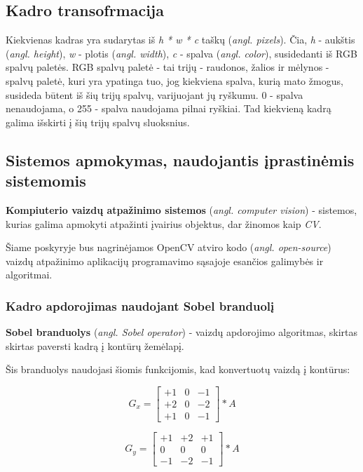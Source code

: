 \documentclass{VUMIFInfKursinis}
\begin{document}
\subsection{Kadro transofrmacija}
Kiekvienas kadras yra sudarytas iš \textit{h * w * c} taškų (\textit{angl. pixels}). Čia, \textit{h} - aukštis (\textit{angl. height}), \textit{w} - plotis (\textit{angl. width}), \textit{c} - spalva (\textit{angl. color}), susidedanti iš RGB spalvų paletės. RGB spalvų paletė - tai trijų - raudonos, žalios ir mėlynos - spalvų paletė, kuri yra ypatinga tuo, jog kiekviena spalva, kurią mato žmogus, susideda būtent iš šių trijų spalvų, varijuojant jų ryškumu. 0 - spalva nenaudojama, o 255 - spalva naudojama pilnai ryškiai. Tad kiekvieną kadrą galima išskirti į šių trijų spalvų sluoksnius.

\subsection{Sistemos apmokymas, naudojantis įprastinėmis sistemomis}
\textbf{Kompiuterio vaizdų atpažinimo sistemos} (\textit{angl. computer vision}) - sistemos, kurias galima apmokyti atpažinti įvairius objektus, dar žinomos kaip \textit{CV}.

Šiame poskyryje bus nagrinėjamos OpenCV atviro kodo (\textit{angl. open-source}) vaizdų atpažinimo aplikacijų programavimo sąsajoje esančios galimybės ir algoritmai.

\subsubsection{Kadro apdorojimas naudojant Sobel branduolį}
\textbf{Sobel branduolys} (\textit{angl. Sobel operator}) - vaizdų apdorojimo algoritmas, skirtas skirtas paversti kadrą į kontūrų žemėlapį.

Šis branduolys naudojasi šiomis funkcijomis, kad konvertuotų vaizdą į kontūrus:

\begin{equation}\label{eq:sobelgx}
	G_x = 
	\begin{bmatrix}
	+1 & 0 & -1 \\
	+2 & 0 & -2 \\
	+1 & 0 & -1
	\end{bmatrix} * A
\end{equation}
	
\begin{equation}\label{eq:sobelgy}
	G_y = 
	\begin{bmatrix}
	+1 & +2 & +1 \\
	0 & 0 & 0 \\
	-1 & -2 & -1
	\end{bmatrix} * A
\end{equation}
\end{document}
